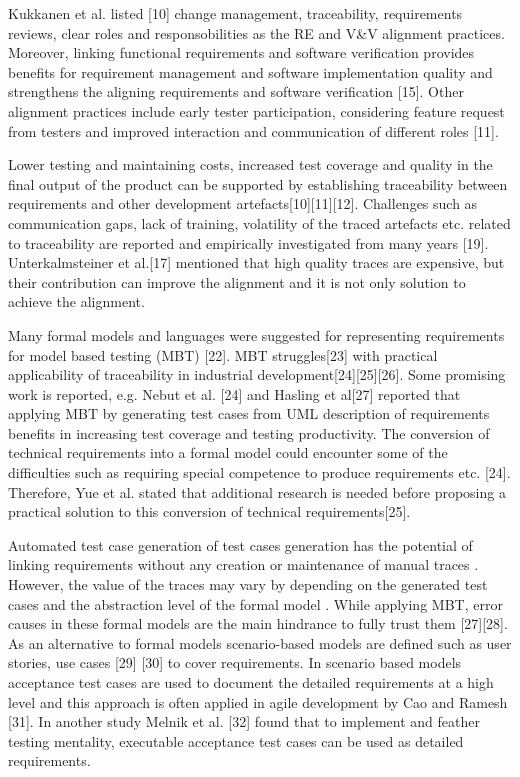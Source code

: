 \documentclass{article}
\begin{document}
Kukkanen et al. listed [10] change management, traceability, requirements reviews, clear roles and responsobilities as the RE and V&V alignment practices. Moreover, linking functional requirements and software verification provides benefits for requirement management and software implementation quality and strengthens the aligning requirements and software verification [15]. Other alignment practices include early tester participation, considering feature request from testers and improved interaction and communication of different roles [11].

Lower testing and maintaining costs, increased test coverage and quality in the final output of the product can be supported by establishing traceability between requirements and other development artefacts[10][11][12]. Challenges such as communication gaps, lack of training, volatility of the traced artefacts etc. related to traceability are reported  and empirically investigated from many years  \cite{bjarnason2014challenges}[19]. Unterkalmsteiner et al.[17] mentioned that high quality traces are expensive, but their contribution can improve the alignment and it is not only solution to achieve the alignment.

Many formal models and languages were suggested for representing requirements for model based testing (MBT) [22]. MBT struggles[23] with practical applicability of traceability in industrial development[24][25][26]. Some promising work is reported, e.g. Nebut et al. [24] and Hasling et al[27] reported that applying MBT by generating test cases from UML description of requirements benefits in increasing test coverage and testing productivity. The conversion of technical requirements into a formal model could encounter some of the difficulties such as requiring special competence to produce requirements etc. [24]. Therefore, Yue et al. stated that additional research is needed before proposing a practical solution to this conversion of technical requirements[25]. 

Automated test case generation of test cases generation has the potential of linking requirements without any creation or maintenance  of manual traces  \cite{bjarnason2014challenges}. However, the value of the traces may vary by depending on the generated test cases and the abstraction level of the formal model  \cite{sabaliauskaite2010challenges}. While applying MBT, error causes in these formal models are the main hindrance to fully trust them [27][28]. As an alternative to formal models scenario-based models are defined such as user stories, use cases [29] [30] to cover requirements. In scenario based models acceptance test cases are used to document the detailed requirements at a high level and this approach is often applied in agile development by Cao and Ramesh [31]. In  another study Melnik et al. [32] found that to implement and feather testing mentality, executable acceptance test cases can be used as detailed requirements.
\end{document}
